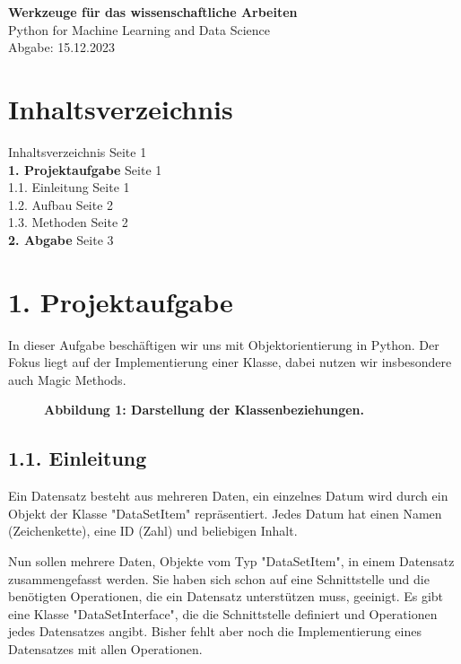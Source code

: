 \documentclass[a4paper,12pt]{article}
\begin{document}
\begin{flushleft}
{\bfseries\Large Werkzeuge f\"ur das wissenschaftliche Arbeiten}\\
\normalsize Python for Machine Learning and Data Science\\
\normalfont\hspace*{4.5cm}Abgabe: 15.12.2023\\
\hrulefill
\end{flushleft}

\section*{Inhaltsverzeichnis}
Inhaltsverzeichnis \dotfill Seite 1\\
\textbf{1. Projektaufgabe} \dotfill Seite 1\\
1.1. Einleitung \dotfill Seite 1\\
1.2. Aufbau \dotfill Seite 2\\
1.3. Methoden \dotfill Seite 2\\
\textbf{2. Abgabe} \dotfill Seite 3\\
\hrulefill

\section{1. Projektaufgabe}
\justify
In dieser Aufgabe besch\"aftigen wir uns mit Objektorientierung in Python. Der Fokus liegt auf der Implementierung einer Klasse, dabei nutzen wir insbesondere auch Magic Methods.

\begin{figure}[h!]
    \centering
    
    \caption*{\scriptsize\bfseries Abbildung 1: \normalfont Darstellung der Klassenbeziehungen.}
\end{figure}

\subsection{1.1. Einleitung}
\justify
Ein Datensatz besteht aus mehreren Daten, ein einzelnes Datum wird durch ein Objekt der Klasse "DataSetItem" repr\"asentiert. Jedes Datum hat einen Namen (Zeichenkette), eine ID (Zahl) und beliebigen Inhalt.

Nun sollen mehrere Daten, Objekte vom Typ "DataSetItem", in einem Datensatz zusammengefasst werden. Sie haben sich schon auf eine Schnittstelle und die ben\"otigten Operationen, die ein Datensatz unterst\"utzen muss, geeinigt. Es gibt eine Klasse "DataSetInterface", die die Schnittstelle definiert und Operationen jedes Datensatzes angibt. Bisher fehlt aber noch die Implementierung eines Datensatzes mit allen Operationen.
\end{document}
